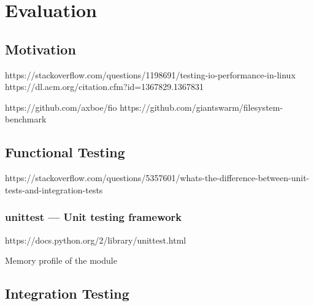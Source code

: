 \chapter{Evaluation}
\label{cha:evaluation}

\section{Motivation}
\label{sec:motivation}


https://stackoverflow.com/questions/1198691/testing-io-performance-in-linux
https://dl.acm.org/citation.cfm?id=1367829.1367831

https://github.com/axboe/fio
https://github.com/giantswarm/filesystem-benchmark

\section{Functional Testing}
\label{sec:rep_functional_testing}

https://stackoverflow.com/questions/5357601/whats-the-difference-between-unit-tests-and-integration-tests

\subsection{unittest — Unit testing framework}
\label{sub:unittest}

https://docs.python.org/2/library/unittest.html


Memory profile of the module

\section{Integration Testing}
\label{sub:integration_testing}